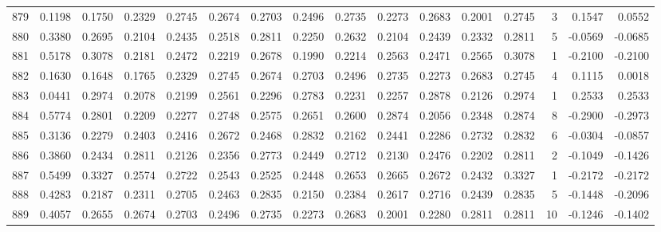 \begin{tabular}{lrrrrrrrrrrrrrrr}
879 &      0.1198 &  0.1750 &  0.2329 &  0.2745 &  0.2674 &  0.2703 &  0.2496 &  0.2735 &  0.2273 &  0.2683 &   0.2001 &     0.2745 &      3 &                    0.1547 &                     0.0552 \\
880 &      0.3380 &  0.2695 &  0.2104 &  0.2435 &  0.2518 &  0.2811 &  0.2250 &  0.2632 &  0.2104 &  0.2439 &   0.2332 &     0.2811 &      5 &                   -0.0569 &                    -0.0685 \\
881 &      0.5178 &  0.3078 &  0.2181 &  0.2472 &  0.2219 &  0.2678 &  0.1990 &  0.2214 &  0.2563 &  0.2471 &   0.2565 &     0.3078 &      1 &                   -0.2100 &                    -0.2100 \\
882 &      0.1630 &  0.1648 &  0.1765 &  0.2329 &  0.2745 &  0.2674 &  0.2703 &  0.2496 &  0.2735 &  0.2273 &   0.2683 &     0.2745 &      4 &                    0.1115 &                     0.0018 \\
883 &      0.0441 &  0.2974 &  0.2078 &  0.2199 &  0.2561 &  0.2296 &  0.2783 &  0.2231 &  0.2257 &  0.2878 &   0.2126 &     0.2974 &      1 &                    0.2533 &                     0.2533 \\
884 &      0.5774 &  0.2801 &  0.2209 &  0.2277 &  0.2748 &  0.2575 &  0.2651 &  0.2600 &  0.2874 &  0.2056 &   0.2348 &     0.2874 &      8 &                   -0.2900 &                    -0.2973 \\
885 &      0.3136 &  0.2279 &  0.2403 &  0.2416 &  0.2672 &  0.2468 &  0.2832 &  0.2162 &  0.2441 &  0.2286 &   0.2732 &     0.2832 &      6 &                   -0.0304 &                    -0.0857 \\
886 &      0.3860 &  0.2434 &  0.2811 &  0.2126 &  0.2356 &  0.2773 &  0.2449 &  0.2712 &  0.2130 &  0.2476 &   0.2202 &     0.2811 &      2 &                   -0.1049 &                    -0.1426 \\
887 &      0.5499 &  0.3327 &  0.2574 &  0.2722 &  0.2543 &  0.2525 &  0.2448 &  0.2653 &  0.2665 &  0.2672 &   0.2432 &     0.3327 &      1 &                   -0.2172 &                    -0.2172 \\
888 &      0.4283 &  0.2187 &  0.2311 &  0.2705 &  0.2463 &  0.2835 &  0.2150 &  0.2384 &  0.2617 &  0.2716 &   0.2439 &     0.2835 &      5 &                   -0.1448 &                    -0.2096 \\
889 &      0.4057 &  0.2655 &  0.2674 &  0.2703 &  0.2496 &  0.2735 &  0.2273 &  0.2683 &  0.2001 &  0.2280 &   0.2811 &     0.2811 &     10 &                   -0.1246 &                    -0.1402 \\

\end{tabular}
